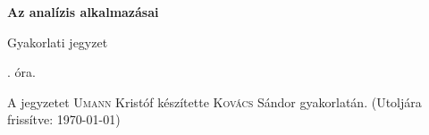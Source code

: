 \documentclass[a4paper,11.5pt]{article}
\begin{document}
	\setlength\parindent{0pt}
	\def\a{\textbf{a}}
	\def\b{\textbf{b}}
	\def\N{\hskip 10 true mm}
	\def\a{\textbf{a}}
	\def\b{\textbf{b}}
	\def\c{\textbf{c}}
	\def\d{\textbf{d}}
	\def\e{\textbf{e}}
	\def\gg{$\gamma$}
	\def\vi{\textbf{i}}
	\def\jj{\textbf{j}}
	\def\kk{\textbf{k}}
	\def\fh{\overrightarrow}
	\def\l{\lambda}
	\def\m{\mu}
	\def\v{\textbf{v}}
	\def\0{\textbf{0}}
	\def\s{\hspace{0.2mm}\vphantom{\beta}}
	\def\Z{\mathbb{Z}}
	\def\Q{\mathbb{Q}}
	\def\R{\mathbb{R}}
	\def\C{\mathbb{C}}
	\def\N{\mathbb{N}}
	\def\Rn{\mathbb{R}^{n}}
	\def\Ra{\overline{\mathbb{R}}}
	\def\sume{\displaystyle\sum_{n=1}^{+\infty}}
	\def\sumn{\displaystyle\sum_{n=0}^{+\infty}}
	\def\biz{\emph{Bizonyítás:\ }}
	\def\narrow{\underset{n\rightarrow+\infty}{\longrightarrow}}
	\def\limn{\displaystyle\lim_{n\to +\infty}}
	
	\theoremstyle{definition}
	\newtheorem{theorem}{Tétel}[subsubsection]
	
	\theoremstyle{definition}
	\newtheorem{definition}[theorem]{Definíció}
	\newtheorem{example}[theorem]{Példa}
	\newtheorem{exercise}[theorem]{Házi feladat}
	\newtheorem{note}[theorem]{Megjegyzés}
	\newtheorem{task}[theorem]{Feladat}
	\newtheorem{revision}[theorem]{Emlékeztető}
	\begin{center}
		{\LARGE\textbf{Az analízis alkalmazásai}}
		\smallskip

		{\Large Gyakorlati jegyzet}

		. óra.
	\end{center}
	A jegyzetet \textsc{Umann} Kristóf készítette \textsc{Kovács} Sándor gyakorlatán. (Utoljára frissítve: \today)
	
\end{document}
